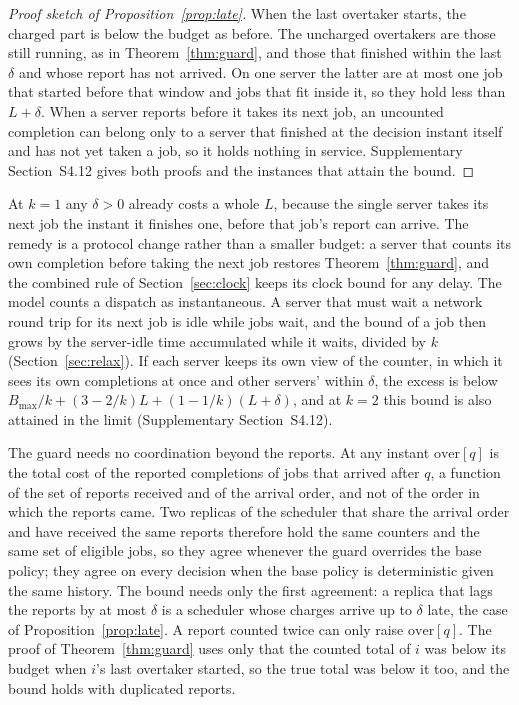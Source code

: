 \begin{proof}[Proof sketch of Proposition~\ref{prop:late}]
When the last overtaker starts, the charged part is below the budget as before. The
uncharged overtakers are those still running, as in Theorem~\ref{thm:guard}, and those that
finished within the last $\delta$ and whose report has not arrived. On one server the
latter are at most one job that started before that window and jobs that fit inside it, so
they hold less than $L + \delta$. When a server reports before it takes its next job, an
uncounted completion can belong only to a server that finished at the decision instant
itself and has not yet taken a job, so it holds nothing in service. Supplementary
Section~S4.12 gives both proofs and the instances that attain the bound.
\end{proof}

At $k = 1$ any $\delta > 0$ already costs a whole $L$, because the single server takes its
next job the instant it finishes one, before that job's report can arrive. The remedy is a
protocol change rather than a smaller budget: a server that counts its own completion
before taking the next job restores Theorem~\ref{thm:guard}, and the combined rule of
Section~\ref{sec:clock} keeps its clock bound for any delay. The model counts a dispatch as
instantaneous. A server that must wait a network round trip for its next job is idle
while jobs wait, and the bound of a job then grows by the server-idle time accumulated
while it waits, divided by $k$
(Section~\ref{sec:relax}). If each server keeps its own view of the counter, in which it
sees its own completions at once and other servers' within $\delta$, the excess is below
$B_{\max}/k + (3-2/k)L + (1-1/k)(L+\delta)$, and at $k = 2$ this bound is also attained in
the limit (Supplementary Section~S4.12).

The guard needs no coordination beyond the reports. At any instant $\mathrm{over}[q]$ is
the total cost of the reported completions of jobs that arrived after $q$, a function of
the set of reports received and of the arrival order, and not of the order in which the
reports came. Two replicas of the scheduler that share the arrival order and have received
the same reports therefore hold the same counters and the same set of eligible jobs, so they
agree whenever the guard overrides the base policy; they agree on every decision when the
base policy is deterministic given the same history. The bound needs only the first
agreement: a replica that lags the reports by at most $\delta$ is a scheduler whose charges
arrive up to $\delta$ late, the case of Proposition~\ref{prop:late}. A report counted twice can only raise
$\mathrm{over}[q]$. The proof of Theorem~\ref{thm:guard} uses only that the counted total
of $i$ was below its budget when $i$'s last overtaker started, so the true total was below
it too, and the bound holds with duplicated reports.

